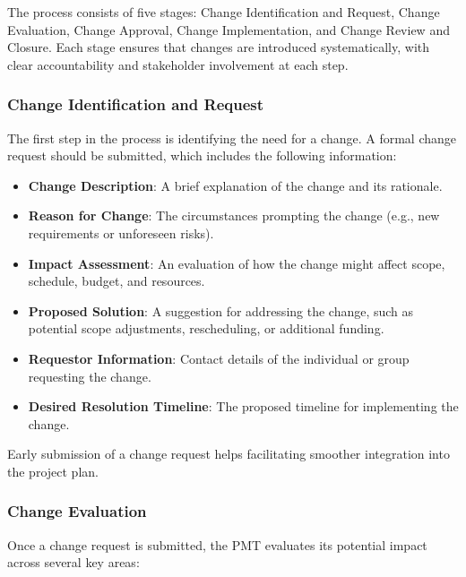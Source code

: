 \documentclass[a4paper,12pt]{article}
\begin{document}
The process consists of five stages: Change Identification and Request, Change Evaluation, Change Approval, Change Implementation, and Change Review and Closure. Each stage ensures that changes are introduced systematically, with clear accountability and stakeholder involvement at each step.

\subsubsection*{Change Identification and Request}

The first step in the process is identifying the need for a change. A formal change request should be submitted, which includes the following information:

\begin{itemize}[left=1em, itemsep=0pt, topsep=0pt] 
    \item \textbf{Change Description}: A brief explanation of the change and its rationale. 
    \item \textbf{Reason for Change}: The circumstances prompting the change (e.g., new requirements or unforeseen risks).
    \item \textbf{Impact Assessment}: An evaluation of how the change might affect scope, schedule, budget, and resources.
    \item \textbf{Proposed Solution}: A suggestion for addressing the change, such as potential scope adjustments, rescheduling, or additional funding.
    \item \textbf{Requestor Information}: Contact details of the individual or group requesting the change. 
    \item \textbf{Desired Resolution Timeline}: The proposed timeline for implementing the change. 
\end{itemize}

Early submission of a change request helps facilitating smoother integration into the project plan.

\subsubsection*{Change Evaluation}

Once a change request is submitted, the PMT evaluates its potential impact across several key areas:
\end{document}
